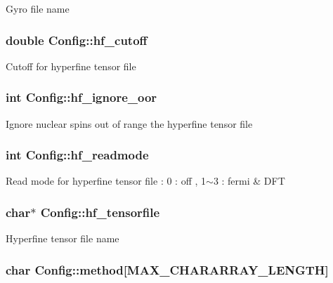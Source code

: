 Gyro file name \hypertarget{structConfig_af82a9ccd3b05247db3da179361faef85}{
\subsubsection[{hf\-\_\-cutoff}]{\setlength{\rightskip}{0pt plus 5cm}double Config\-::hf\-\_\-cutoff}}\label{structConfig_af82a9ccd3b05247db3da179361faef85}
Cutoff for hyperfine tensor file \hypertarget{structConfig_a840b086fb6ef148cea4e370967da30e9}{
\subsubsection[{hf\-\_\-ignore\-\_\-oor}]{\setlength{\rightskip}{0pt plus 5cm}int Config\-::hf\-\_\-ignore\-\_\-oor}}\label{structConfig_a840b086fb6ef148cea4e370967da30e9}
Ignore nuclear spins out of range the hyperfine tensor file \hypertarget{structConfig_a3d4d5a3943f20928bdce09e64fa4bb37}{
\subsubsection[{hf\-\_\-readmode}]{\setlength{\rightskip}{0pt plus 5cm}int Config\-::hf\-\_\-readmode}}\label{structConfig_a3d4d5a3943f20928bdce09e64fa4bb37}
Read mode for hyperfine tensor file \-: 0 \-: off , 1$\sim$3 \-: fermi \& D\-F\-T \hypertarget{structConfig_a52710072ec30b071e08c1b62f7450c0f}{
\subsubsection[{hf\-\_\-tensorfile}]{\setlength{\rightskip}{0pt plus 5cm}char$\ast$ Config\-::hf\-\_\-tensorfile}}\label{structConfig_a52710072ec30b071e08c1b62f7450c0f}
Hyperfine tensor file name \hypertarget{structConfig_a73d927bf5bdb0f39d024b23dc66f0c1c}{
\subsubsection[{method}]{\setlength{\rightskip}{0pt plus 5cm}char Config\-::method\mbox{[}M\-A\-X\-\_\-\-C\-H\-A\-R\-A\-R\-R\-A\-Y\-\_\-\-L\-E\-N\-G\-T\-H\mbox{]}}}\label{structConfig_a73d927bf5bdb0f39d024b23dc66f0c1c}
